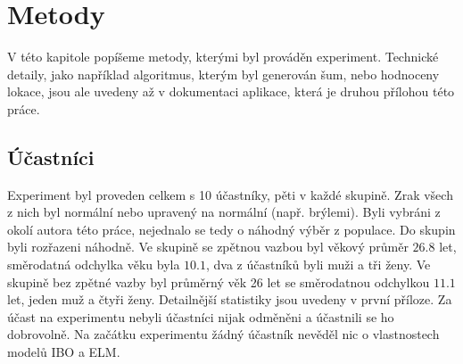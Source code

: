 \chapter{Metody}

V této kapitole popíšeme metody, kterými byl prováděn experiment. Technické detaily,
jako například algoritmus, kterým byl generován šum, nebo hodnoceny lokace, jsou
ale uvedeny až v dokumentaci aplikace, která je druhou přílohou této práce.

\section{Účastníci}

Experiment byl proveden celkem s 10 účastníky, pěti v každé skupině. Zrak všech z nich byl
normální nebo upravený na normální (např.  brýlemi). Byli vybráni z okolí
autora této práce, nejednalo se tedy o náhodný výběr z populace. Do skupin byli
rozřazeni náhodně. Ve skupině se zpětnou vazbou byl věkový průměr $26.8$ let,
směrodatná odchylka věku byla $10.1$, dva z účastníků byli muži a tři ženy. Ve
skupině bez zpětné vazby byl průměrný věk 26 let se směrodatnou odchylkou
$11.1$ let, jeden muž a čtyři ženy. Detailnější statistiky jsou uvedeny v první
příloze. Za účast na experimentu nebyli účastníci nijak odměněni a účastnili se
ho dobrovolně. Na začátku experimentu žádný účastník nevěděl nic o vlastnostech
modelů IBO a ELM.

